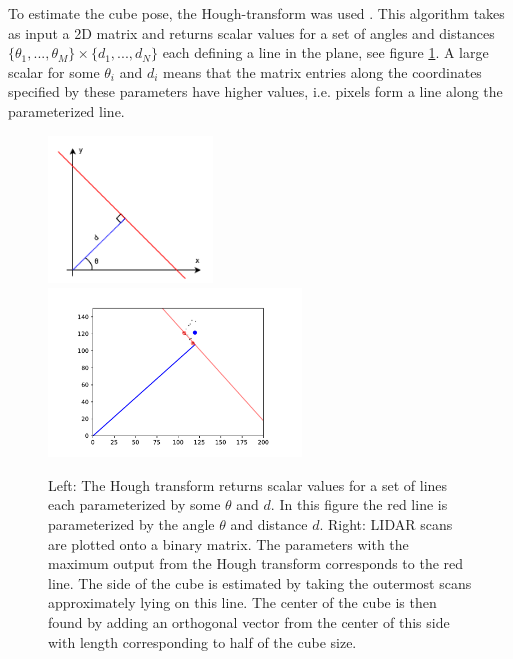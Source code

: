To estimate the cube pose, the Hough-transform was used \cite{duda1972use}.
This algorithm takes as input a 2D matrix and returns scalar values for a set
of angles and distances $\lbrace \theta_1, ..., \theta_M\rbrace \times \lbrace
d_1, ..., d_N \rbrace$ each defining a line in the plane, see figure
\ref{fig:hough}. A large scalar for some $\theta_i$ and $d_i$ means that the
matrix entries along the coordinates specified by these parameters have higher
values, i.e. pixels form a line along the parameterized line.

\begin{figure}[h]
    \centering
    \includegraphics[width=0.39\textwidth]{res/hough.pdf}
    \includegraphics[width=0.60\textwidth]{res/hough_example.pdf}

    \caption{Left: The Hough transform returns scalar values for a set of lines each
    parameterized by some $\theta$ and $d$. In this figure the red line is
    parameterized by the angle $\theta$ and distance $d$.
    Right: LIDAR scans are plotted onto a binary matrix. The parameters with
    the maximum output from the Hough transform corresponds to the red line.
    The side of the cube is estimated by taking the outermost scans
    approximately lying on this line. The center of the cube is then found by
    adding an orthogonal vector from the center of this side with length
    corresponding to half of the cube size.}

    \label{fig:hough}
\end{figure}

